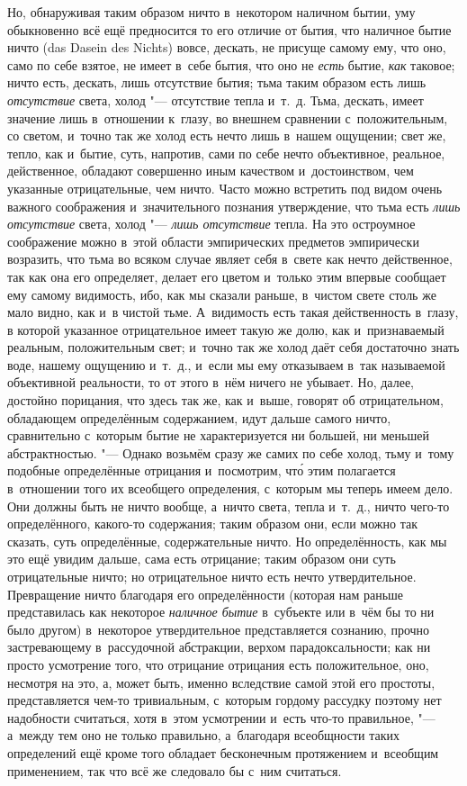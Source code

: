 Но, обнаруживая таким образом ничто в~некотором наличном бытии, уму обыкновенно
всё ещё предносится то его отличие от бытия, что наличное бытие ничто (das
Dasein des Nichts) вовсе, дескать, не присуще самому ему, что оно, само по себе
взятое, не имеет в~себе бытия, что оно не {\em есть} бытие, {\em как} таковое; ничто
есть, дескать, лишь отсутствие бытия; тьма таким образом есть лишь
{\em отсутствие} света, холод "--- отсутствие тепла и~т.~д. Тьма, дескать,
имеет значение лишь в~отношении к~глазу, во внешнем сравнении с~положительным,
со светом, и~точно так же холод есть нечто лишь в~нашем ощущении; свет же,
тепло, как и~бытие, суть, напротив, сами по себе нечто объективное, реальное,
действенное, обладают совершенно иным качеством и~достоинством, чем указанные
отрицательные, чем ничто. Часто можно встретить под видом очень важного
соображения и~значительного познания утверждение, что тьма есть
{\em лишь отсутствие} света, холод "--- {\em лишь отсутствие} тепла. На это
остроумное соображение можно в~этой области эмпирических предметов эмпирически
возразить, что тьма во всяком случае являет себя в~свете как нечто действенное,
так как она его определяет, делает его цветом и~только этим впервые сообщает
ему самому видимость, ибо, как мы сказали раньше, в~чистом свете столь же мало
видно, как и~в чистой тьме. А~видимость есть такая действенность в~глазу, в
которой указанное отрицательное имеет такую же долю, как и~признаваемый
реальным, положительным свет; и~точно так же холод даёт себя достаточно знать
воде, нашему ощущению и~т.~д., и~если мы ему отказываем в~так называемой
объективной реальности, то от этого в~нём ничего не убывает. Но, далее,
достойно порицания, что здесь так же, как и~выше, говорят об отрицательном,
обладающем определённым содержанием, идут дальше самого ничто, сравнительно
с~которым бытие не характеризуется ни большей, ни меньшей абстрактностью. "---
Однако возьмём сразу же самих по себе холод, тьму и~тому подобные определённые
отрицания и~посмотрим, чт\'{о} этим полагается в~отношении того их всеобщего
определения, с~которым мы теперь имеем дело. Они должны быть не ничто вообще,
а~ничто света, тепла и~т.~д., ничто чего-то определённого, какого-то
содержания; таким образом они, если можно так сказать, суть определённые,
содержательные ничто. Но определённость, как мы это ещё увидим дальше, сама
есть отрицание; таким образом они суть отрицательные ничто; но отрицательное
ничто есть нечто утвердительное. Превращение ничто благодаря его определённости
(которая нам раньше представилась как некоторое {\em наличное бытие} в~субъекте
или в~чём бы то ни было другом) в~некоторое утвердительное представляется
сознанию, прочно застревающему в~рассудочной абстракции, верхом
парадоксальности; как ни просто усмотрение того, что отрицание отрицания есть
положительное, оно, несмотря на это, а, может быть, именно вследствие самой
этой его простоты, представляется чем-то тривиальным, с~которым гордому
рассудку поэтому нет надобности считаться, хотя в~этом усмотрении и~есть что-то
правильное, "--- а~между тем оно не только правильно, а~благодаря всеобщности
таких определений ещё кроме того обладает бесконечным протяжением и~всеобщим
применением, так что всё же следовало бы с~ним считаться.

